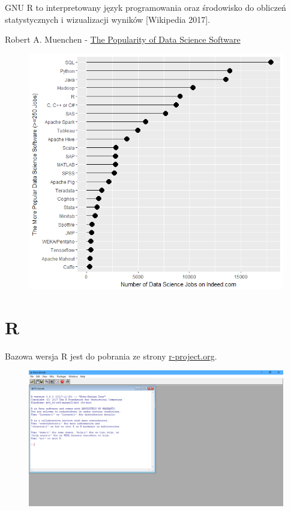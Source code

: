 \documentclass[]{book}
\begin{document}
GNU R to interpretowany język programowania oraz środowisko do obliczeń
statystycznych i wizualizacji wyników {[}Wikipedia 2017{]}.

Robert A. Muenchen - \href{http://r4stats.com/articles/popularity/}{The
Popularity of Data Science Software}

\begin{figure}
\centering
\includegraphics{img/pop_r1.png}
\caption{}
\end{figure}

\section{R}\label{r}

Bazowa wersja R jest do pobrania ze strony
\href{https://cloud.r-project.org/}{r-project.org}.

\begin{figure}
\centering
\includegraphics{img/r.png}
\caption{}
\end{figure}
\end{document}
